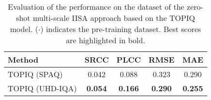 \begin{table}
    \centering
    \begin{tabular}{lcccc}
    \toprule
    Method & SRCC & PLCC & RMSE & MAE \\ \midrule
    TOPIQ (SPAQ) & 0.042 & 0.088 & 0.323 & 0.290 \\
    TOPIQ (UHD-IQA) & \textbf{0.054} & \textbf{0.166} & \textbf{0.290} & \textbf{0.255} \\
    \bottomrule
    \end{tabular}
    \caption{Evaluation of the performance on the \dataset dataset of the zero-shot multi-scale IISA approach based on the TOPIQ \cite{chen2024topiq} model. ($\cdot$) indicates the pre-training dataset. Best scores are highlighted in bold.}    \label{tab:supplementary_multiresolution_naive_results}
\end{table}